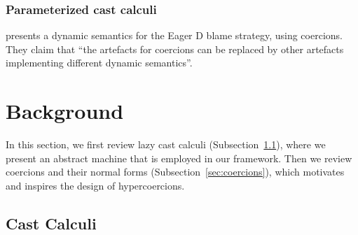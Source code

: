 \documentclass[runningheads]{llncs}
\begin{document}
\subsubsection{Parameterized cast calculi}

\citet{garcia2014deriving} presents a dynamic semantics for the Eager
D blame strategy, using coercions. They claim that ``the artefacts for
coercions can be replaced by other artefacts implementing different
dynamic semantics''.



\section{Background} \label{sec:background}

In this section, we first review lazy cast calculi (Subsection~\ref{sec:cast-calculi}), where
we present an abstract machine that is employed in our framework. Then
we review coercions and their normal forms (Subsection~\ref{sec:coercions}), which
motivates and inspires the design of hypercoercions.

\subsection{Cast Calculi} \label{sec:cast-calculi}
\end{document}
